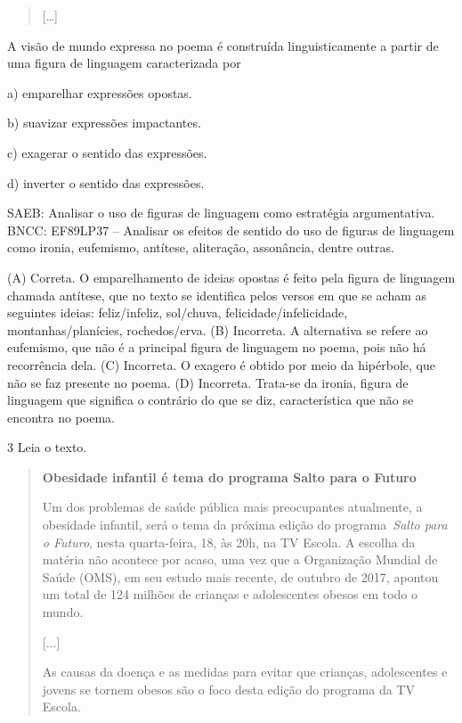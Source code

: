 \begin{quote}
{[}\ldots{]}
\end{quote}


A visão de mundo expressa no poema é construída linguisticamente a
partir de uma figura de linguagem caracterizada por

a) emparelhar expressões opostas.

b) suavizar expressões impactantes.

c) exagerar o sentido das expressões.

d) inverter o sentido das expressões.

SAEB: Analisar o uso de figuras de linguagem como estratégia
argumentativa. BNCC: EF89LP37 -- Analisar os efeitos de sentido do uso
de figuras de linguagem como ironia, eufemismo, antítese, aliteração,
assonância, dentre outras.

(A) Correta. O emparelhamento de ideias opostas é feito pela figura de
linguagem chamada antítese, que no texto se identifica pelos versos em
que se acham as seguintes ideias: feliz/infeliz, sol/chuva,
felicidade/infelicidade, montanhas/planícies, rochedos/erva. (B)
Incorreta. A alternativa se refere ao eufemismo, que não é a principal
figura de linguagem no poema, pois não há recorrência dela. (C)
Incorreta. O exagero é obtido por meio da hipérbole, que não se faz
presente no poema. (D) Incorreta. Trata-se da ironia, figura de
linguagem que significa o contrário do que se diz, característica que
não se encontra no poema.

\num{3} Leia o texto.

\begin{quote}
\textbf{Obesidade infantil é tema do programa Salto para o Futuro}

Um dos problemas de saúde pública mais preocupantes atualmente, a
obesidade infantil, será o tema da próxima edição do
programa~\emph{Salto para o Futuro}, nesta quarta-feira, 18, às 20h, na
TV Escola. A escolha da matéria não acontece por acaso, uma vez que a
Organização Mundial de Saúde (OMS), em seu estudo mais recente, de
outubro de 2017, apontou um total de 124 milhões de crianças e
adolescentes obesos em todo o mundo.

{[}...{]}

As causas da doença e as medidas para evitar que crianças, adolescentes
e jovens se tornem obesos são o foco desta edição do programa da TV
Escola.
\end{quote}

